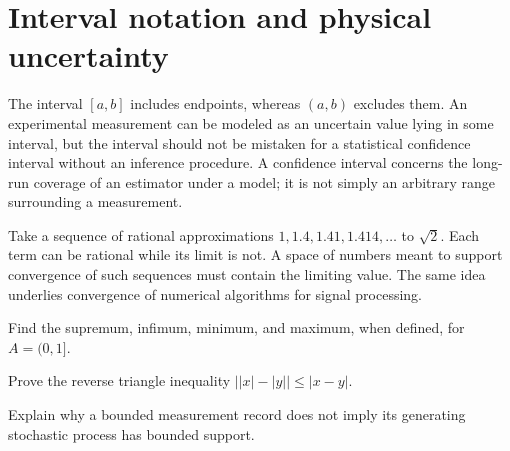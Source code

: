 \section{Interval notation and physical uncertainty}
The interval $[a,b]$ includes endpoints, whereas $(a,b)$ excludes them. An experimental measurement can be modeled as an uncertain value lying in some interval, but the interval should not be mistaken for a statistical confidence interval without an inference procedure. A confidence interval concerns the long-run coverage of an estimator under a model; it is not simply an arbitrary range surrounding a measurement.

\begin{workedexample}
Take a sequence of rational approximations $1,1.4,1.41,1.414,\ldots$ to $\sqrt2$. Each term can be rational while its limit is not. A space of numbers meant to support convergence of such sequences must contain the limiting value. The same idea underlies convergence of numerical algorithms for signal processing.
\end{workedexample}
\begin{exercises}
\item Find the supremum, infimum, minimum, and maximum, when defined, for $A=(0,1]$.
\item Prove the reverse triangle inequality $\big||x|-|y|\big|\le |x-y|$.
\item Explain why a bounded measurement record does not imply its generating stochastic process has bounded support.
\end{exercises}